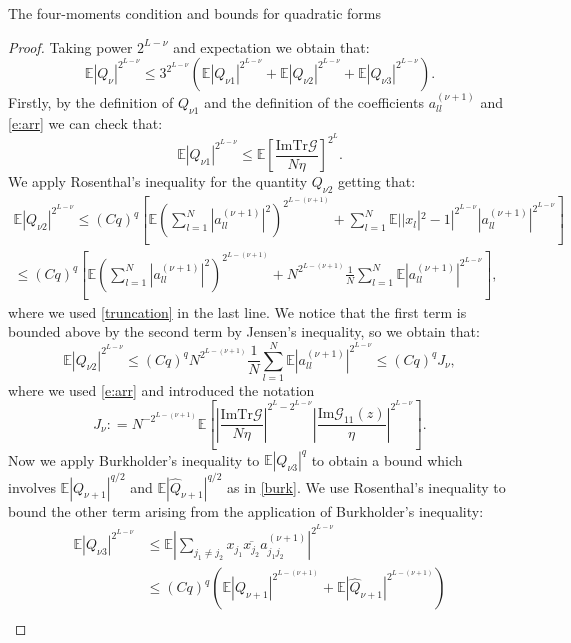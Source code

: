 \documentclass[11pt, a4paper, oneside]{book}
\numberwithin{equation}{chapter}
\newcommand{\E}{\mathbb E}
\newcommand{\Tr}{\mathrm{Tr}}
\newcommand{\beq}{\begin{equation}}
\newcommand{\eeq}{\end{equation}}
\begin{document}
\begin{section}{The four-moments condition and bounds for quadratic forms}
\begin{proof}
Taking power $2^{L-\nu}$ and expectation we obtain that:
\begin{equation} \label{QN}
\E | Q_{\nu}  |^{2^{L-\nu}} \leq 3^{2^{L-\nu}} \left ( \E | Q_{\nu1}  |^{2^{L-\nu}} + \E | Q_{\nu2}  |^{2^{L-\nu}} + \E | Q_{\nu3}  |^{2^{L-\nu}} \right ).
\end{equation}
%
Firstly, by the definition of $Q_{\nu1} $ and the definition of the coefficients $a_{ll}^{(\nu+1)}$ and \eqref{e:arr} we can check that:
%
\beq \label{Q1}
\E | Q_{\nu1}  |^{2^{L-\nu}} \leq \E \left [\frac{\mathrm{Im} \Tr \mathcal{G}  }{N\eta}  \right ]^{2^L}.
\eeq
%
We apply Rosenthal's inequality for the quantity
$ Q_{\nu 2} $ getting that:
%
\begin{multline}
\E | Q_{\nu2}  |^{2^{L-\nu}}
\leq  (Cq)^q \left [\E \left ( \sum \limits_{l=1}^N  | a_{ll}^{(\nu+1)} |^2  \right )^{2^{L-(\nu+1)}} + \sum \limits_{l=1}^N \E | |x_{l}|^2 -1 |^{2^{L-\nu}} |a_{ll}^{(\nu+1)} |^{2^{L-\nu}} \right ]
\\
\leq (Cq)^q \left [ \E \left ( \sum \limits_{l=1}^N | a_{ll}^{(\nu+1)} |^2 \right )^{2^{L-(\nu+1)}} + N^{2^{L-(\nu+1)}} \frac{1}{N} \sum \limits_{l=1}^N  \E |a_{ll}^{(\nu+1)} |^{2^{L-\nu}} \right ] ,
\end{multline}
%
where we used \eqref{truncation} in the last line. We notice that the first term is bounded above by the second term by Jensen's inequality, so we obtain that:
%
\begin{equation}
\E | Q_{\nu2}  |^{2^{L-\nu}}\leq (Cq)^q N^{2^{L-(\nu+1)}} \frac{1}{N} \sum \limits_{l=1}^N  \E |a_{ll}^{(\nu+1)} |^{2^{L-\nu}}
\leq (Cq)^q J_\nu,
\end{equation}
%
where we used \eqref{e:arr} and introduced the notation
\begin{equation}
J_{\nu}: = N^{-2^{L- (\nu+1)}}\E \left [ \left| \frac{\mathrm{Im} \Tr \mathcal{G}  }{N\eta} \right|^{2^L- 2^{L-\nu}}\left|\frac{\mathrm{Im} \mathcal{G}_{11} (z)}{\eta}\right|^{2^{L-\nu}} \right ].
\end{equation}
%
Now we apply Burkholder's inequality to $\E|Q_{\nu3}|^q$ to obtain a bound which involves $\E|Q_{\nu+1}|^{q/2}$ and $\E|\widehat{Q}_{\nu+1}|^{q/2}$ as in \eqref{burk}. We use Rosenthal's inequality to bound the other term arising from the application of Burkholder's inequality:
\begin{align}
\E|Q_{\nu3}|^{2^{L-\nu}} &\leq \E \left |\sum_{ j_1 \neq j_2}x_{j_1} \overline{x_{j_2}}   a_{j_1j_2}^{(\nu+1)} \right |^{2^{L-\nu}} \nonumber
\\
&\leq
 (Cq)^{q} \left (\E |Q_{\nu+1} |^{2^{L-(\nu+1)}} + \E |\widehat{Q}_{\nu+1} |^{2^{L-(\nu+1)}} \right ) \nonumber \\

\end{align}
\end{proof}
\end{section}
\end{document}

